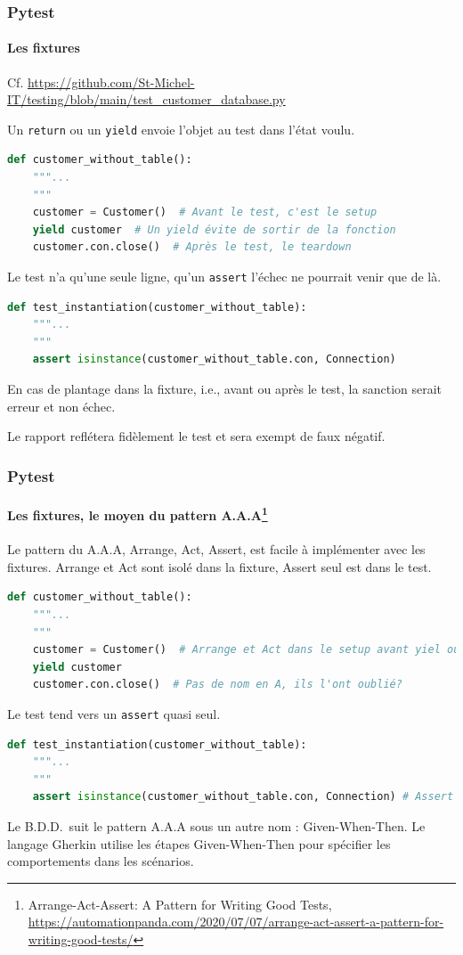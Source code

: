 \documentclass{beamer}
\begin{document}
    \begin{frame}[fragile]
        \frametitle{Pytest}
        \framesubtitle{Les fixtures}
        \transdissolve
        Cf. \url{https://github.com/St-Michel-IT/testing/blob/main/test_customer_database.py}

        Un \lstinline{return} ou un \lstinline{yield} envoie l'objet au test dans l'état voulu.
        \begin{lstlisting}[language=Python]
def customer_without_table():
    """...
    """
    customer = Customer()  # Avant le test, c'est le setup
    yield customer  # Un yield évite de sortir de la fonction
    customer.con.close()  # Après le test, le teardown
        \end{lstlisting}
        Le test n'a qu'une seule ligne, qu'un \lstinline{assert} l'échec ne
        pourrait venir que de là.
        \begin{lstlisting}[language=Python]
def test_instantiation(customer_without_table):
    """...
    """
    assert isinstance(customer_without_table.con, Connection)
        \end{lstlisting}
        En cas de plantage dans la fixture, i.e., avant ou après le test, la sanction
        serait erreur et non échec.

        Le rapport reflétera fidèlement le test et sera exempt de faux négatif.
    \end{frame}

    \begin{frame}[fragile]
        \frametitle{Pytest}
        \framesubtitle{Les fixtures, le moyen du pattern A.A.A\footnote{Arrange-Act-Assert: A Pattern for Writing Good Tests, \url{https://automationpanda.com/2020/07/07/arrange-act-assert-a-pattern-for-writing-good-tests/}}}
        \transdissolve
        Le pattern du A.A.A, Arrange, Act, Assert, est facile à implémenter avec les fixtures.
        Arrange et Act sont isolé dans la fixture, Assert seul est dans le test.

        \begin{lstlisting}[language=Python]
def customer_without_table():
    """...
    """
    customer = Customer()  # Arrange et Act dans le setup avant yiel ou return
    yield customer
    customer.con.close()  # Pas de nom en A, ils l'ont oublié?
        \end{lstlisting}
        Le test tend vers un \lstinline{assert} quasi seul.
        \begin{lstlisting}[language=Python]
def test_instantiation(customer_without_table):
    """...
    """
    assert isinstance(customer_without_table.con, Connection) # Assert
        \end{lstlisting}
        Le B.D.D.~suit le pattern A.A.A sous un autre nom : Given-When-Then.
        Le langage Gherkin utilise les étapes Given-When-Then pour spécifier les comportements dans les scénarios.
    \end{frame}
\end{document}
